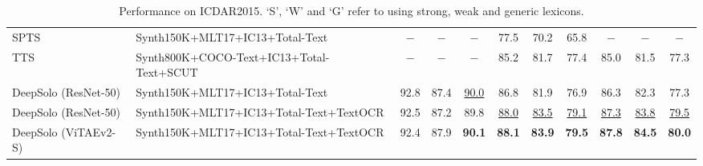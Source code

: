\documentclass[10pt,twocolumn,letterpaper]{article}
\begin{document}
\begin{table*}[!t]
{\begin{tabular}{l|l|ccc|ccc|ccc}
SPTS \cite{peng2022spts} &Synth150K+MLT17+IC13+Total-Text &$-$ &$-$ &$-$ &77.5 &70.2 &65.8 &$-$ &$-$ &$-$ \\
TTS \cite{kittenplon2022towards} &Synth800K+COCO-Text+IC13+Total-Text+SCUT &$-$ &$-$ &$-$ &85.2 &81.7 &77.4 &85.0 &81.5 &77.3 \\
\rowcolor{gray!20} DeepSolo (ResNet-50) &Synth150K+MLT17+IC13+Total-Text &92.8 &87.4 &\underline{90.0} &86.8 &81.9 &76.9 &86.3 &82.3 &77.3 \\
\rowcolor{gray!20} DeepSolo (ResNet-50) &Synth150K+MLT17+IC13+Total-Text+TextOCR &92.5 &87.2 &89.8 &\underline{88.0} &\underline{83.5} &\underline{79.1} &\underline{87.3} &\underline{83.8} &\underline{79.5} \\
\rowcolor{gray!20} DeepSolo (ViTAEv2-S) &Synth150K+MLT17+IC13+Total-Text+TextOCR &92.4 &87.9 &\textbf{90.1} &\textbf{88.1} &\textbf{83.9} &\textbf{79.5} &\textbf{87.8} &\textbf{84.5} &\textbf{80.0} \\
\bottomrule[1.5pt]\end{tabular}}
\caption{Performance on ICDAR2015. ‘S’, ‘W’ and ‘G’ refer to using strong, weak and generic lexicons.}
\label{tab:main_ic15}
\end{table*}
\begin{table}[!t]
\centering
{}
\caption{End-to-end recognition performance on CTW1500. ResNet-50 is adopted in DeepSolo. ‘length’: the maximum recognition length. ‘\dag’: the FPS measured on one A100 GPU.}
\label{tab:main_ctw}
\vspace{-3mm}
\end{table}
\end{document}
